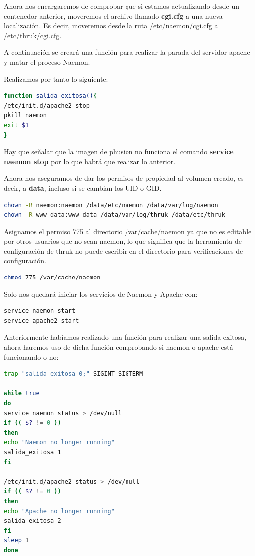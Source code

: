 Ahora nos encargaremos de comprobar que si estamos actualizando desde un contenedor anterior, moveremos el archivo llamado \textbf{cgi.cfg} a una nueva localización. Es decir, moveremos desde la ruta /etc/naemon/cgi.cfg a /etc/thruk/cgi.cfg.

A continuación se creará una función para realizar la parada del servidor apache y matar el proceso Naemon.

Realizamos por tanto lo siguiente:

\begin{lstlisting}[language=bash]
function salida_exitosa(){
/etc/init.d/apache2 stop
pkill naemon
exit $1
}
\end{lstlisting}

Hay que señalar que la imagen de phusion no funciona el comando \textbf{service naemon stop} por lo que habrá que realizar lo anterior.

Ahora nos aseguramos de dar los permisos de propiedad al volumen creado, es decir, a \textbf{data}, incluso si se cambian los UID o GID.

\begin{lstlisting}[language=bash]
chown -R naemon:naemon /data/etc/naemon /data/var/log/naemon
chown -R www-data:www-data /data/var/log/thruk /data/etc/thruk
\end{lstlisting}


Asignamos el permiso 775 al directorio /var/cache/naemon ya que no es editable por otros usuarios que no sean naemon, lo que significa que la herramienta de configuración de thruk no puede escribir en el directorio para verificaciones de configuración.

\begin{lstlisting}[language=bash]
chmod 775 /var/cache/naemon
\end{lstlisting}
\newpage
Solo nos quedará iniciar los servicios de Naemon y Apache con:

\begin{lstlisting}[language=bash]
service naemon start
service apache2 start
\end{lstlisting}

Anteriormente habíamos realizado una función para realizar una salida exitosa, ahora haremos uso de dicha función comprobando si naemon o apache está funcionando o no:
\begin{lstlisting}[language=bash]
trap "salida_exitosa 0;" SIGINT SIGTERM

while true
do
service naemon status > /dev/null
if (( $? != 0 ))
then
echo "Naemon no longer running"
salida_exitosa 1
fi

/etc/init.d/apache2 status > /dev/null
if (( $? != 0 ))
then
echo "Apache no longer running"
salida_exitosa 2
fi
sleep 1
done
\end{lstlisting}


